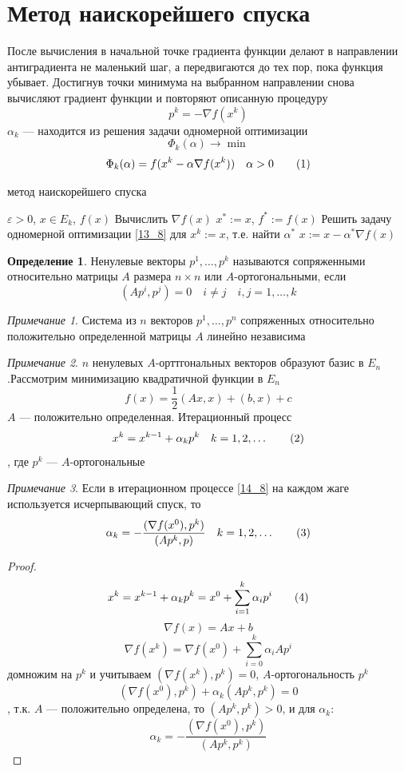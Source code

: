 \documentclass[oneside]{book}
\newcommand\addtag{\refstepcounter{equation}\tag{\theequation}}
\theoremstyle{plain}
\theoremstyle{remark}
\newtheorem*{remark}{Примечание}
\theoremstyle{definition}
\newtheorem*{definition}{Определение}
\newenvironment{rualgo}[1][]
  {\begin{algorithm}[#1]
     \selectlanguage{russian}%
     \floatname{algorithm}{Алгоритм}%
     \renewcommand{\algorithmicif}{{\color{red}\textbf{если}}}%
     \renewcommand{\algorithmicthen}{{\color{red}\textbf{тогда}}}%
     \renewcommand{\algorithmicelse}{{\color{red}\textbf{иначе}}}%
     \renewcommand{\algorithmicend}{{\color{red}\textbf{конец}}}%
     \renewcommand{\algorithmicfor}{{\color{red}\textbf{для}}}%
     \renewcommand{\algorithmicto}{{\color{red}\textbf{до}}}%
     \renewcommand{\algorithmicdo}{{\color{red}\textbf{делать}}}%
     \renewcommand{\algorithmicwhile}{{\color{red}\textbf{пока}}}%
     \renewcommand{\algorithmicrepeat}{{\color{red}\textbf{повторять}}}%
     \renewcommand{\algorithmicuntil}{{\color{red}\textbf{до тех пор пока}}}%
     \renewcommand{\algorithmicloop}{{\color{red}\textbf{повторять}}}%
     \renewcommand{\algorithmicnot}{{\color{blue}\textbf{не}}}%
     \renewcommand{\algorithmicand}{{\color{blue}\textbf{и}}}%
     \renewcommand{\algorithmicor}{{\color{blue}\textbf{или}}}%
     \renewcommand{\algorithmicrequire}{{\color{blue}\textbf{Ввод}}}%
     \renewcommand{\algorithmicrensure}{{\color{blue}\textbf{Вывод}}}%
     \renewcommand{\algorithmicreturn}{{\color{red}\textbf{Вернуть}}}%
     \renewcommand{\algorithmicrtrue}{{\color{blue}\textbf{истинна}}}%
     \renewcommand{\algorithmicrfalse}{{\color{blue}\textbf{ложь}}}%
  }
  {\end{algorithm}}
\begin{document}
\section{Метод наискорейшего спуска}
\label{sec:org4190266}
После вычисления в начальной точке градиента функции делают в направлении антиградиента не маленький шаг, а передвигаются до тех пор, пока функция убывает. Достигнув точки минимума на выбранном направлении снова вычисляют градиент функции и повторяют описанную процедуру
\[ p^k = -\nabla f(x^k) \]
\(\alpha_k\) --- находится из решения задачи одномерной оптимизации
\[ \Phi_k(\alpha) \to \min \]
\[ \Phi_k(\alpha) = f(x^k - \alpha \nabla f(x^k)) \quad \alpha > 0 \addtag\label{13_8} \]
\begin{rualgo}[H]
\caption{метод наискорейшего спуска}
\begin{algorithmic}[1]
\REQUIRE \(\varepsilon > 0\), \(x \in E_k\), \(f(x)\)
\LOOP
  \STATE Вычислить \(\nabla f(x)\)
    \RETURN \(x^* := x\), \(f^* := f(x)\)
  \ENDIF
  \STATE Решить задачу одномерной оптимизации \ref{13_8} для \(x^k := x\), т.е. найти \(\alpha^*\)
  \STATE \(x := x - \alpha^* \nabla f(x)\)
\ENDLOOP
\end{algorithmic}
\end{rualgo}
\begin{definition}
Ненулевые векторы \(p^1,\dots, p^k\) называются сопряженными относительно матрицы \(A\) размера \(n \times n\) или \(A\)-ортогональными, если
\[ (Ap^i, p^j) = 0 \quad i\neq j \quad i, j = 1,\dots,k\]
\end{definition}
\begin{remark}
Система из \(n\) векторов \(p^1,\dots,p^n\) сопряженных относительно положительно определенной матрицы \(A\) линейно независима
\end{remark}
\begin{remark}
\(n\) ненулевых \(A\)-орттгональных векторов образуют базис в \(E_n\).Рассмотрим минимизацию квадратичной функции в \(E_n\)
\[ f(x) = \frac{1}{2} (Ax, x) + (b, x) + c \]
\(A\) --- положительно определенная. Итерационный процесс
\[ x^k = x^{k - 1} + \alpha_k p^k \quad k = 1,2,\dots \addtag\label{14_8} \]
, где \(p^k\) --- \(A\)-ортогональные
\end{remark}
\begin{remark}
Если в итерационном процессе \ref{14_8} на каждом жаге используется исчерпывающий спуск, то
\[ \alpha_k = -\frac{(\nabla f(x^0), p^k)}{(Ap^k, p)} \quad k = 1,2,\dots \addtag\label{15_8} \]
\end{remark}
\begin{proof}
\[ x^k = x^{k - 1} + \alpha_k p^k = x^0 + \sum_{i = 1}^{k} \alpha_i p^i \addtag\label{16_8} \]
\[ \nabla f(x) = Ax + b \]
\[ \nabla f(x^k) = \nabla f(x^0) + \sum_{i = 0}^k \alpha_i A p^i \]
домножим на \(p^k\) и учитываем \((\nabla f(x^k), p^k) = 0\), \(A\)-ортогональность \(p^k\)
\[ (\nabla f(x^0), p^k) + \alpha_k (A p^k, p^k) = 0 \]
, т.к. \(A\) --- положительно определена, то \((A p^k, p^k) > 0\), и для \(\alpha_k\):
\[ \alpha_k = -\frac{(\nabla f(x^0), p^k)}{(A p^k, p^k)} \]
\end{proof}
\end{document}
